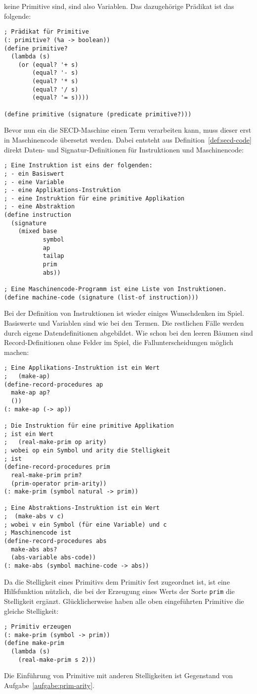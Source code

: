 keine Primitive sind, sind also Variablen.  Das dazugehörige Prädikat
ist das folgende:
%
\begin{verbatim}
; Prädikat für Primitive
(: primitive? (%a -> boolean))
(define primitive?
  (lambda (s)
    (or (equal? '+ s)
        (equal? '- s)
        (equal? '* s)
        (equal? '/ s)
        (equal? '= s))))

(define primitive (signature (predicate primitive?)))
\end{verbatim}
%
Bevor nun ein die SECD-Maschine einen Term verarbeiten kann, muss
dieser erst in Maschinencode übersetzt werden.  Dabei entsteht aus
Definition~\ref{def:secd-code} direkt Daten- und Signatur-Definitionen
für Instruktionen und Maschinencode:
%
\begin{verbatim}
; Eine Instruktion ist eins der folgenden:
; - ein Basiswert
; - eine Variable
; - eine Applikations-Instruktion
; - eine Instruktion für eine primitive Applikation
; - eine Abstraktion
(define instruction
  (signature
    (mixed base
           symbol
           ap
           tailap
           prim
           abs))

; Eine Maschinencode-Programm ist eine Liste von Instruktionen.
(define machine-code (signature (list-of instruction)))
\end{verbatim}
%
Bei der Definition von Instruktionen ist wieder einiges Wunschdenken
im Spiel.  Basiswerte und Variablen sind wie bei den Termen.  Die
restlichen Fälle werden durch eigene Datendefinitionen abgebildet.
Wie schon bei den leeren Bäumen sind Record-Definitionen ohne Felder
im Spiel, die Fallunterscheidungen möglich machen:
%
\begin{verbatim}
; Eine Applikations-Instruktion ist ein Wert
;   (make-ap)
(define-record-procedures ap
  make-ap ap?
  ())
(: make-ap (-> ap))

; Die Instruktion für eine primitive Applikation
; ist ein Wert
;   (real-make-prim op arity)
; wobei op ein Symbol und arity die Stelligkeit
; ist
(define-record-procedures prim
  real-make-prim prim?
  (prim-operator prim-arity))
(: make-prim (symbol natural -> prim))

; Eine Abstraktions-Instruktion ist ein Wert
;  (make-abs v c)
; wobei v ein Symbol (für eine Variable) und c
; Maschinencode ist
(define-record-procedures abs
  make-abs abs?
  (abs-variable abs-code))
(: make-abs (symbol machine-code -> abs))
\end{verbatim}
%
Da die Stelligkeit eines Primitivs dem Primitiv fest zugeordnet
ist, ist eine Hilfsfunktion nützlich, die bei der Erzeugung eines
Werts der Sorte \texttt{prim} die Stelligkeit ergänzt.
Glücklicherweise haben alle oben eingeführten Primitive die gleiche
Stelligkeit:
%
\begin{verbatim}
; Primitiv erzeugen
(: make-prim (symbol -> prim))
(define make-prim
  (lambda (s)
    (real-make-prim s 2)))
\end{verbatim}
%
Die Einführung von Primitive mit anderen Stelligkeiten ist Gegenstand
von Aufgabe~\ref{aufgabe:prim-arity}.

